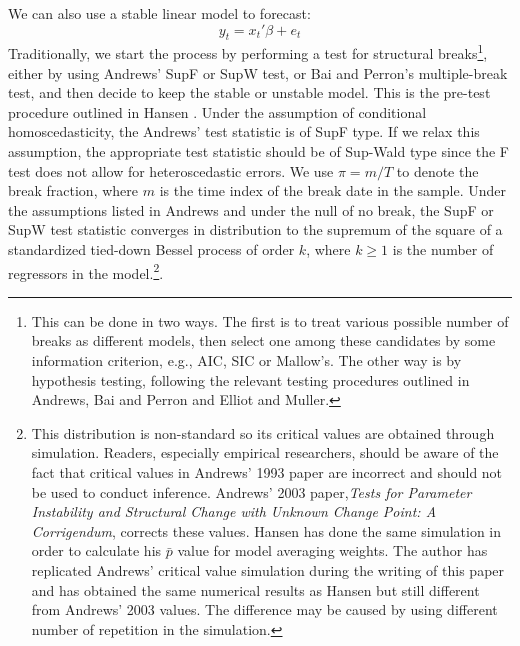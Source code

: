We can also use a stable linear model to forecast:
\begin{equation}
	y_t = x_t'\beta + e_t
\end{equation}
Traditionally, we start the process by performing a test for structural breaks\footnote{This can be done in two ways. The first is to treat various possible number of breaks as different models, then select one among these candidates by some information criterion, e.g., AIC, SIC or Mallow's. The other way is by hypothesis testing, following the relevant testing procedures outlined in Andrews\cite{andrews93}, Bai and Perron\cite{bai_perron98} and Elliot and Muller\cite{elliott_muller_RES2006}. }, either by using Andrews' SupF or SupW test, or Bai and Perron's multiple-break test, and then decide to keep the stable or unstable model. This is the pre-test procedure outlined in Hansen \cite{hansen2009averaging}. Under the assumption of conditional homoscedasticity, the Andrews' test statistic is of SupF type. If we relax this assumption, the appropriate test statistic should be of Sup-Wald type since the F test does not allow for heteroscedastic errors. We use $\pi = m/T$ to denote the break fraction, where $m$ is the time index of the break date in the sample. Under the assumptions listed in Andrews \cite{andrews93} and under the null of no break, the SupF or SupW test statistic converges in distribution to the supremum of the square of a standardized tied-down Bessel process of order $k$, where $k \geq 1$ is the number of regressors in the model.\footnote{This distribution is non-standard so its critical values are obtained through simulation. Readers, especially empirical researchers, should be aware of the fact that critical values in Andrews' 1993 paper are incorrect and should not be used to conduct inference. Andrews' 2003 paper,\emph{Tests for Parameter Instability and Structural Change with Unknown Change Point: A Corrigendum}, corrects these values. Hansen \cite{hansen2009averaging} has done the same simulation in order to calculate his $\bar{p}$ value for model averaging weights. The author has replicated Andrews' critical value simulation during the writing of this paper and has obtained the same numerical results as Hansen but still different from Andrews' 2003 values. The difference may be caused by using different number of repetition in the simulation.}.

